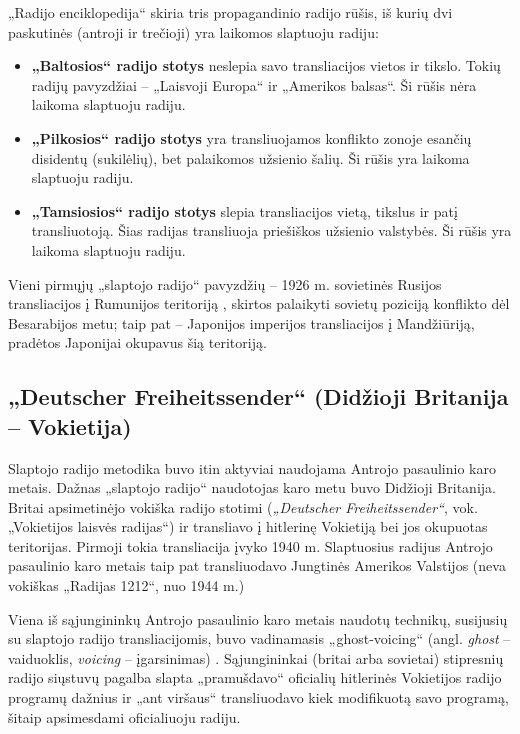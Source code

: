 \documentclass[kursinis-darbas]{vukf}
\begin{document}
„Radijo enciklopedija“ skiria tris propagandinio radijo rūšis, iš kurių dvi paskutinės (antroji ir trečioji) yra laikomos slaptuoju radiju:

\begin{itemize}
	\item \textbf{„Baltosios“ radijo stotys} neslepia savo transliacijos vietos ir tikslo. Tokių radijų pavyzdžiai – „Laisvoji Europa“ ir „Amerikos balsas“. Ši rūšis nėra laikoma slaptuoju radiju.
	\item \textbf{„Pilkosios“ radijo stotys} yra transliuojamos konflikto zonoje esančių disidentų (sukilėlių), bet palaikomos užsienio šalių. Ši rūšis yra laikoma slaptuoju radiju.
	\item \textbf{„Tamsiosios“ radijo stotys} slepia transliacijos vietą, tikslus ir patį transliuotoją. Šias radijas transliuoja priešiškos užsienio valstybės. Ši rūšis yra laikoma slaptuoju radiju.
\end{itemize}

Vieni pirmųjų „slaptojo radijo“ pavyzdžių – 1926 m. sovietinės Rusijos transliacijos į Rumunijos teritoriją \cite[p.~1114]{chs_encyclopedia_of_radio}, skirtos palaikyti sovietų poziciją konflikto dėl Besarabijos metu; taip pat – Japonijos imperijos transliacijos į Mandžiūriją, pradėtos Japonijai okupavus šią teritoriją.

\subsection{„Deutscher Freiheitssender“ (Didžioji Britanija – Vokietija)}

Slaptojo radijo metodika buvo itin aktyviai naudojama Antrojo pasaulinio karo metais. Dažnas „slaptojo radijo“ naudotojas karo metu buvo Didžioji Britanija. Britai apsimetinėjo vokiška radijo stotimi (\emph{„Deutscher Freiheitssender“}, vok. „Vokietijos laisvės radijas“) ir transliavo į hitlerinę Vokietiją bei jos okupuotas teritorijas. Pirmoji tokia transliacija įvyko 1940 m. Slaptuosius radijus Antrojo pasaulinio karo metais taip pat transliuodavo Jungtinės Amerikos Valstijos (neva vokiškas „Radijas 1212“, nuo 1944 m.) \cite[p.~1115]{chs_encyclopedia_of_radio}

Viena iš sąjungininkų Antrojo pasaulinio karo metais naudotų technikų, susijusių su slaptojo radijo transliacijomis, buvo vadinamasis „ghost-voicing“ (angl. \emph{ghost} – vaiduoklis, \emph{voicing} – įgarsinimas) \cite[p.~1115]{chs_encyclopedia_of_radio}. Sąjungininkai (britai arba sovietai) stipresnių radijo siųstuvų pagalba slapta „pramušdavo“ oficialių hitlerinės Vokietijos radijo programų dažnius ir „ant viršaus“ transliuodavo kiek modifikuotą savo programą, šitaip apsimesdami oficialiuoju radiju.
\end{document}
